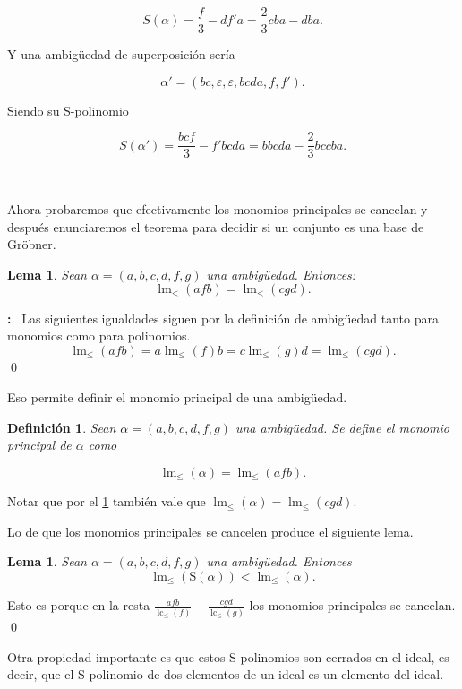 \documentclass[12pt]{report}
\theoremstyle{customstyle}
\newtheorem{definition}[theorem]{Definición}
\newtheorem{lemma}[theorem]{Lema}
\renewenvironment{proof}[1][\proofname]{{\noindent \bfseries #1: }}{\qed} %
\theoremstyle{factstyle}
\DeclareMathOperator{\lm}{lm}
\DeclareMathOperator{\lc}{lc}
\renewcommand{\S}{\text{S}}
\begin{document}
\[S(α) = \frac{f}{3} - d f' a = \frac{2}{3} cba - dba  \text{.} \]

\noindent Y una ambigüedad de superposición sería

\[ α' = (bc, ε, ε, bcda, f, f') \text{.} \]

\noindent Siendo su S-polinomio

\[ S(α') = \frac{bc f}{3} - f' bcda = bbcda - \frac{2}{3} bccba \text{.} \]

\

Ahora probaremos que efectivamente los monomios principales se cancelan y después enunciaremos el teorema para decidir si un conjunto es una base de Gröbner.

\begin{lemma}\label{lemma:lm ambs}
  Sean $α = (a, b, c, d, f, g)$ una ambigüedad. Entonces:
  \[ \lm_≤{(afb)} = \lm_≤{(cgd)} \text{.}\]
\end{lemma}
\begin{proof}\
  Las siguientes igualdades siguen por la definición de ambigüedad tanto para monomios como para polinomios.
  \[ \lm_≤{(afb)} = a\lm_≤{(f)}b = c\lm_≤{(g)}d = \lm_≤{(cgd)} \text{.} \]
\end{proof}

Eso permite definir el monomio principal de una ambigüedad.

\begin{definition}
  Sean $α = (a, b, c, d, f, g)$ una ambigüedad. Se define el monomio principal de $α$ como

  \[ \lm_≤(α) = \lm_≤(afb) \text{.}\]
\end{definition}

Notar que por el \cref{lemma:lm ambs} también vale que $\lm_≤(α) = \lm_≤(cgd)$.

Lo de que los monomios principales se cancelen produce el siguiente lema.

\begin{lemma}
  Sean $α = (a, b, c, d, f, g)$ una ambigüedad. Entonces
  \[ \lm_≤(\S(α)) < \lm_≤(α) \text{.}\]
\end{lemma}
\begin{proof}
  Esto es porque en la resta $\frac{afb}{\lc_≤(f)} - \frac{cgd}{\lc_≤(g)}$ los monomios principales se cancelan.
\end{proof}

Otra propiedad importante es que estos S-polinomios son cerrados en el ideal, es decir, que el S-polinomio de dos elementos de un ideal es un elemento del ideal.
\end{document}
